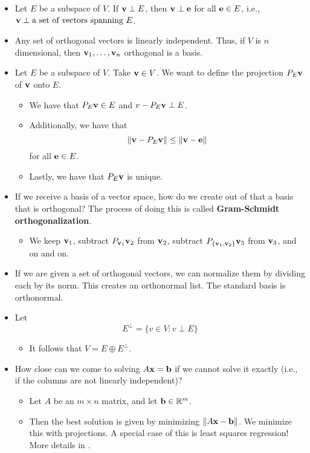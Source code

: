 \documentclass[../../notes.tex]{subfiles}
\begin{document}
\begin{itemize}
    \item Let $E$ be a subspace of $V$. If $\mathbf{v}\perp E$, then $\mathbf{v}\perp\mathbf{e}$ for all $\mathbf{e}\in E$, i.e., $\mathbf{v}\perp\text{a set of vectors spanning }E$.
    \item Any set of orthogonal vectors is linearly independent. Thus, if $V$ is $n$ dimensional, then $\mathbf{v}_1,\dots,\mathbf{v}_n$ orthogonal is a basis.
    \item Let $E$ be a subspace of $V$. Take $\mathbf{v}\in V$. We want to define the projection $P_E\mathbf{v}$ of $\mathbf{v}$ onto $E$.
    \begin{itemize}
        \item We have that $P_E\mathbf{v}\in E$ and $v-P_E\mathbf{v}\perp E$.
        \item Additionally, we have that
        \begin{equation*}
            \norm{\mathbf{v}-P_E\mathbf{v}} \leq \norm{\mathbf{v}-\mathbf{e}}
        \end{equation*}
        for all $\mathbf{e}\in E$.
        \item Lastly, we have that $P_E\mathbf{v}$ is unique.
    \end{itemize}
    \item If we receive a basis of a vector space, how do we create out of that a basis that is orthogonal? The process of doing this is called \textbf{Gram-Schmidt orthogonalization}.
    \begin{itemize}
        \item We keep $\mathbf{v}_1$, subtract $P_{\mathbf{v}_1}\mathbf{v}_2$ from $\mathbf{v}_2$, subtract $P_{\{\mathbf{v}_1,\mathbf{v}_2\}}\mathbf{v}_3$ from $\mathbf{v}_3$, and on and on.
    \end{itemize}
    \item If we are given a set of orthogonal vectors, we can normalize them by dividing each by its norm. This creates an orthonormal list. The standard basis is orthonormal.
    \item Let
    \begin{equation*}
        E^\perp = \{v\in V:v\perp E\}
    \end{equation*}
    \begin{itemize}
        \item It follows that $V=E\oplus E^\perp$.
    \end{itemize}
    \item How close can we come to solving $A\mathbf{x}=\mathbf{b}$ if we cannot solve it exactly (i.e., if the columns are not linearly independent)?
    \begin{itemize}
        \item Let $A$ be an $m\times n$ matrix, and let $\mathbf{b}\in\mathbb{R}^m$.
        \item Then the best solution is given by minimizing $\norm{A\mathbf{x}-\mathbf{b}}$. We minimize this with projections. A special case of this is least squares regression! More details in \textcite{bib:Treil}.
    \end{itemize}
\end{itemize}
\end{document}
